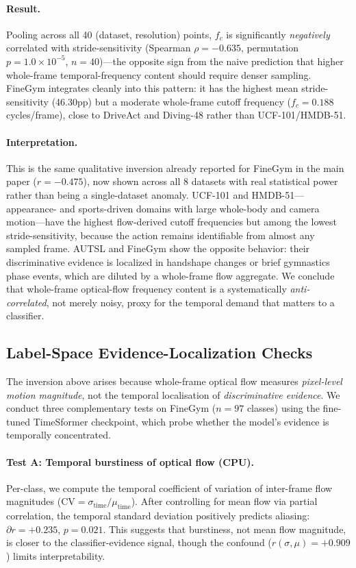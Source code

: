 \documentclass[runningheads]{llncs}
\begin{document}
\paragraph{Result.} Pooling across all 40 (dataset, resolution) points, $f_c$ is significantly \emph{negatively} correlated with stride-sensitivity (Spearman $\rho=-0.635$, permutation $p=1.0\times10^{-5}$, $n=40$)---the opposite sign from the naive prediction that higher whole-frame temporal-frequency content should require denser sampling. FineGym integrates cleanly into this pattern: it has the highest mean stride-sensitivity (46.30pp) but a moderate whole-frame cutoff frequency ($f_c=0.188$ cycles/frame), close to DriveAct and Diving-48 rather than UCF-101/HMDB-51.

\paragraph{Interpretation.} This is the same qualitative inversion already reported for FineGym in the main paper ($r=-0.475$), now shown across all 8 datasets with real statistical power rather than being a single-dataset anomaly. UCF-101 and HMDB-51---appearance- and sports-driven domains with large whole-body and camera motion---have the highest flow-derived cutoff frequencies but among the lowest stride-sensitivity, because the action remains identifiable from almost any sampled frame. AUTSL and FineGym show the opposite behavior: their discriminative evidence is localized in handshape changes or brief gymnastics phase events, which are diluted by a whole-frame flow aggregate. We conclude that whole-frame optical-flow frequency content is a systematically \emph{anti-correlated}, not merely noisy, proxy for the temporal demand that matters to a classifier.

\subsection*{Label-Space Evidence-Localization Checks}

The inversion above arises because whole-frame optical flow measures \emph{pixel-level motion magnitude}, not the temporal localisation of \emph{discriminative evidence}. We conduct three complementary tests on FineGym ($n=97$ classes) using the fine-tuned TimeSformer checkpoint, which probe whether the model's evidence is temporally concentrated.

\paragraph{Test A: Temporal burstiness of optical flow (CPU).} Per-class, we compute the temporal coefficient of variation of inter-frame flow magnitudes ($\mathrm{CV} = \sigma_\mathrm{time}/\mu_\mathrm{time}$). After controlling for mean flow via partial correlation, the temporal standard deviation positively predicts aliasing: $\partial r = +0.235$, $p=0.021$. This suggests that burstiness, not mean flow magnitude, is closer to the classifier-evidence signal, though the confound ($r(\sigma,\mu)=+0.909$) limits interpretability.
\end{document}
